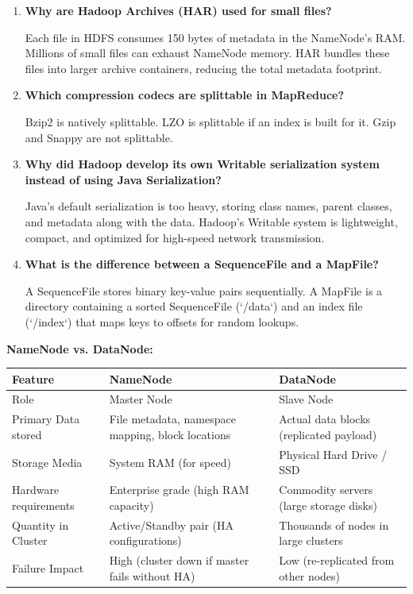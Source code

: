 \documentclass[12pt,a4paper]{article}
\newcommand{\Q}[1]{\textbf{#1}\par\noindent\ignorespaces}
\renewcommand{\arraystretch}{1.45}
\begin{document}
\begin{tcolorbox}[exambox, title={\textbf{Frequently Asked / Viva Questions}}]
\begin{enumerate}[leftmargin=*, topsep=0pt, label=\textbf{Q\arabic*.}, itemsep=5pt]
  \item \Q{Why are Hadoop Archives (HAR) used for small files?}
        Each file in HDFS consumes 150 bytes of metadata in the NameNode's RAM. Millions of small files can exhaust NameNode memory. HAR bundles these files into larger archive containers, reducing the total metadata footprint.
        
  \item \Q{Which compression codecs are splittable in MapReduce?}
        Bzip2 is natively splittable. LZO is splittable if an index is built for it. Gzip and Snappy are not splittable.
        
  \item \Q{Why did Hadoop develop its own Writable serialization system instead of using Java Serialization?}
        Java's default serialization is too heavy, storing class names, parent classes, and metadata along with the data. Hadoop's Writable system is lightweight, compact, and optimized for high-speed network transmission.
        
  \item \Q{What is the difference between a SequenceFile and a MapFile?}
        A SequenceFile stores binary key-value pairs sequentially. A MapFile is a directory containing a sorted SequenceFile (`/data`) and an index file (`/index`) that maps keys to offsets for random lookups.
\end{enumerate}
\end{tcolorbox}

\vspace{6pt}

\begin{tcolorbox}[tikzbox, title={\textbf{Comparison Snapshot}}]
\textbf{NameNode vs. DataNode:}\par\vspace{6pt}\noindent
{\renewcommand{\arraystretch}{1.4}%
\begin{tabularx}{\linewidth}{|B{3.2cm}|Y|Y|}
\hline
\textbf{Feature} & \textbf{NameNode} & \textbf{DataNode} \\
\hline
Role & Master Node & Slave Node \\
\hline
Primary Data stored & File metadata, namespace mapping, block locations & Actual data blocks (replicated payload) \\
\hline
Storage Media & System RAM (for speed) & Physical Hard Drive / SSD \\
\hline
Hardware requirements & Enterprise grade (high RAM capacity) & Commodity servers (large storage disks) \\
\hline
Quantity in Cluster & Active/Standby pair (HA configurations) & Thousands of nodes in large clusters \\
\hline
Failure Impact & High (cluster down if master fails without HA) & Low (re-replicated from other nodes) \\
\hline
\end{tabularx}}
\end{tcolorbox}
\end{document}
